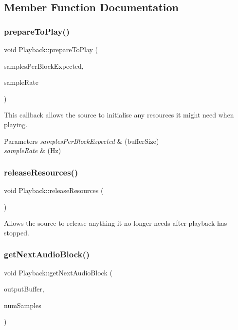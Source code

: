 \subsection{Member Function Documentation}
\mbox{\label{class_playback_a9ab23908a3f6a1c91636f5d107cfbda0}} 
\subsubsection{\texorpdfstring{prepareToPlay()}{prepareToPlay()}}
{\footnotesize\ttfamily void Playback\+::prepare\+To\+Play (\begin{DoxyParamCaption}\item[{int}]{samples\+Per\+Block\+Expected,  }\item[{double}]{sample\+Rate }\end{DoxyParamCaption})}

This callback allows the source to initialise any resources it might need when playing. 
\begin{DoxyParams}{Parameters}
{\em samples\+Per\+Block\+Expected} & (buffer\+Size) \\
\hline
{\em sample\+Rate} & (Hz) \\
\hline
\end{DoxyParams}
\mbox{\label{class_playback_a9267b09168b637dbe4964fe2c2d70faf}} 
\subsubsection{\texorpdfstring{releaseResources()}{releaseResources()}}
{\footnotesize\ttfamily void Playback\+::release\+Resources (\begin{DoxyParamCaption}{ }\end{DoxyParamCaption})}

Allows the source to release anything it no longer needs after playback has stopped. \mbox{\label{class_playback_ad733ca6b60c689fbb7b32e8f9542d46d}} 
\subsubsection{\texorpdfstring{getNextAudioBlock()}{getNextAudioBlock()}}
{\footnotesize\ttfamily void Playback\+::get\+Next\+Audio\+Block (\begin{DoxyParamCaption}\item[{Audio\+Buffer$<$ float $>$ \&}]{output\+Buffer,  }\item[{int}]{num\+Samples }\end{DoxyParamCaption})}

